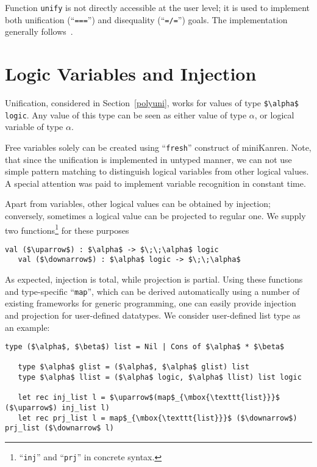 \documentclass[10pt, oneside, nocopyrightspace]{sigplanconf}
\begin{document}
Function \lstinline{unify} is not directly accessible at the user level; it is used
to implement both unification (``\lstinline{===}'') and disequality (``\lstinline{=/=}'') 
goals. The implementation generally follows~\cite{CKanren}.

\section{Logic Variables and Injection}
\label{logics}

Unification, considered in Section~\ref{polyuni}, works for values of type \lstinline[mathescape=true]{$\alpha$ logic}. 
Any value of this type can be seen as either value of type $\alpha$, or logical variable of type $\alpha$. 

\begin{comment}
The type 
itself in made abstract, but its values can be uncovered after refinement (see Section~\ref{refinement}).
\end{comment}

Free variables solely can be created using ``\lstinline{fresh}'' construct of miniKanren. Note, that 
since the unification is implemented in untyped manner, we can not use simple pattern matching to
distinguish logical variables from other logical values. A special attention was paid to implement
variable recognition in constant time.

Apart from variables, other logical values can be obtained by injection; conversely, sometimes
a logical value can be projected to regular one. We supply two functions\footnote{``\lstinline{inj}'' and ``\lstinline{prj}'' in concrete syntax.}
for these purposes

\begin{lstlisting}[mathescape=true]
   val ($\uparrow$) : $\alpha$ -> $\;\;\alpha$ logic
   val ($\downarrow$) : $\alpha$ logic -> $\;\;\alpha$
\end{lstlisting}

As expected, injection is total, while projection is partial. Using these functions and type-specific
``\lstinline{map}'', which can be derived automatically using a number of existing frameworks for
generic programming, one can easily provide injection and projection for user-defined datatypes. We
consider user-defined list type as an example:

\begin{lstlisting}[mathescape=true]
   type ($\alpha$, $\beta$) list = Nil | Cons of $\alpha$ * $\beta$
   
   type $\alpha$ glist = ($\alpha$, $\alpha$ glist) list
   type $\alpha$ llist = ($\alpha$ logic, $\alpha$ llist) list logic

   let rec inj_list l = $\uparrow$(map$_{\mbox{\texttt{list}}}$ ($\uparrow$) inj_list l) 
   let rec prj_list l = map$_{\mbox{\texttt{list}}}$ ($\downarrow$) prj_list ($\downarrow$ l)
\end{lstlisting}
\end{document}
